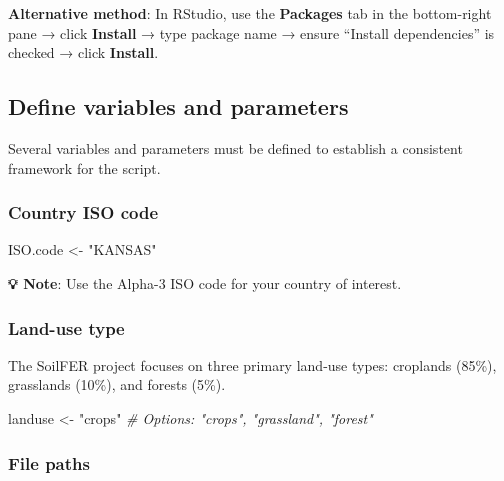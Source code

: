 \documentclass[
  10pt,
  b5paper,
  oneside]{book}
\newenvironment{Shaded}{\begin{snugshade}}{\end{snugshade}}
\newcommand{\CommentTok}[1]{\textcolor[rgb]{0.56,0.35,0.01}{\textit{#1}}}
\newcommand{\NormalTok}[1]{#1}
\newcommand{\OtherTok}[1]{\textcolor[rgb]{0.56,0.35,0.01}{#1}}
\newcommand{\StringTok}[1]{\textcolor[rgb]{0.31,0.60,0.02}{#1}}
\begin{document}
\textbf{Alternative method}: In RStudio, use the \textbf{Packages} tab in the bottom-right pane → click \textbf{Install} → type package name → ensure ``Install dependencies'' is checked → click \textbf{Install}.

\subsection{Define variables and parameters}\label{define-parameters}

Several variables and parameters must be defined to establish a consistent framework for the script.

\subsubsection{Country ISO code}\label{country-iso-code}

\begin{Shaded}
\begin{Highlighting}[]
\NormalTok{ISO.code }\OtherTok{\textless{}{-}} \StringTok{"KANSAS"}  
\end{Highlighting}
\end{Shaded}

\textbf{💡 Note}: Use the Alpha-3 ISO code for your country of interest.

\subsubsection{Land-use type}\label{land-use-type}

The SoilFER project focuses on three primary land-use types: croplands (85\%), grasslands (10\%), and forests (5\%).

\begin{Shaded}
\begin{Highlighting}[]
\NormalTok{landuse }\OtherTok{\textless{}{-}} \StringTok{"crops"}  \CommentTok{\# Options: "crops", "grassland", "forest"}
\end{Highlighting}
\end{Shaded}

\subsubsection{File paths}\label{file-paths}
\end{document}

